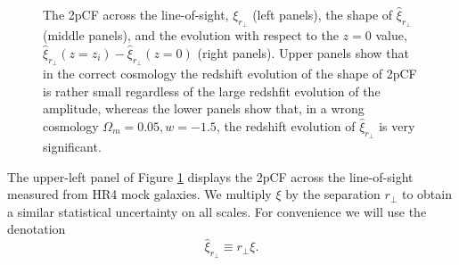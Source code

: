 \documentclass[iop]{emulateapj}
\begin{document}
\begin{figure}
   \caption{\label{fig_diffz}
  The 2pCF across the line-of-sight, $\xi_{r_\perp}$ (left panels), the shape of $\hat{\xi}_{r_\perp}$ (middle panels),
  and the evolution with respect to the $z=0$ value, $\hat{\xi}_{r_{\perp}}(z=z_i) - \hat{\xi}_{r_{\perp}}(z=0)$ (right panels). 
  Upper panels show that in the correct cosmology the redshift evolution of the shape of 2pCF is rather small regardless of the large redshfit evolution of the amplitude, 
  whereas the lower panels show that, in a wrong cosmology $\Omega_m = 0.05,w=-1.5$, the redshift evolution of $\hat{\xi}_{r_\perp}$ is very significant.
   }
\end{figure}

The upper-left panel of Figure \ref{fig_diffz} displays the 2pCF across the line-of-sight measured from HR4 mock galaxies. %
We multiply $\xi$ by the separation $r_\perp$ to obtain a similar statistical uncertainty on all scales.
For convenience we will use the denotation
\begin{equation}
 \hat \xi_{r_{\perp}} \equiv r_{\perp} \xi.
\end{equation}
\end{document}

